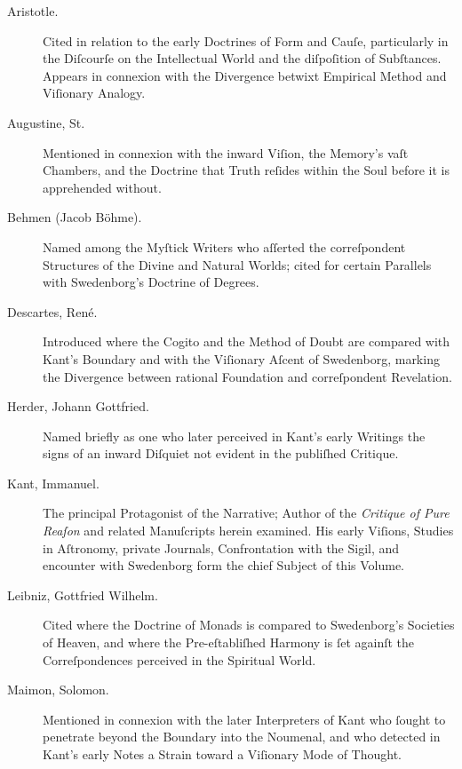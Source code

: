 \documentclass[12pt]{article}
\begin{document}
\begin{description}

\item[Aristotle.]  
Cited in relation to the early Doctrines of Form and Cauſe, particularly in 
the Diſcourſe on the Intellectual World and the diſpoſition of Subſtances. 
Appears in connexion with the Divergence betwixt Empirical Method and 
Viſionary Analogy.

\item[Augustine, St.]  
Mentioned in connexion with the inward Viſion, the Memory’s vaſt Chambers, 
and the Doctrine that Truth reſides within the Soul before it is apprehended 
without.

\item[Behmen (Jacob Böhme).]  
Named among the Myſtick Writers who aſſerted the correſpondent Structures of 
the Divine and Natural Worlds; cited for certain Parallels with Swedenborg’s 
Doctrine of Degrees.

\item[Descartes, René.]  
Introduced where the Cogito and the Method of Doubt are compared with Kant’s 
Boundary and with the Viſionary Aſcent of Swedenborg, marking the Divergence 
between rational Foundation and correſpondent Revelation.

\item[Herder, Johann Gottfried.]  
Named briefly as one who later perceived in Kant’s early Writings the signs 
of an inward Diſquiet not evident in the publiſhed Critique.

\item[Kant, Immanuel.]  
The principal Protagonist of the Narrative; Author of the \textit{Critique of 
Pure Reaſon} and related Manuſcripts herein examined. His early Viſions, 
Studies in Aſtronomy, private Journals, Confrontation with the Sigil, and 
encounter with Swedenborg form the chief Subject of this Volume.

\item[Leibniz, Gottfried Wilhelm.]  
Cited where the Doctrine of Monads is compared to Swedenborg’s Societies of 
Heaven, and where the Pre-eſtabliſhed Harmony is ſet againſt the 
Correſpondences perceived in the Spiritual World.

\item[Maimon, Solomon.]  
Mentioned in connexion with the later Interpreters of Kant who ſought to 
penetrate beyond the Boundary into the Noumenal, and who detected in Kant’s 
early Notes a Strain toward a Viſionary Mode of Thought.


\end{description}
\end{document}
